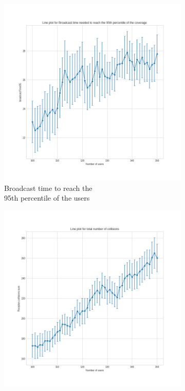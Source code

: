 \clearpage
{}
\begin{figure}[p]
	\centering
	\begin{subfigure}[b]{0.45\textwidth}
		\centering
		\includegraphics[width=\textwidth]{img/continuity-broadcasttime}
		\caption{Broadcast time to reach the\\95th percentile of the
		users}\label{subfig:continuity-bt95}
	\end{subfigure}
	\hfill
	\begin{subfigure}[b]{0.45\textwidth}
		\centering
		\includegraphics[width=\textwidth]{img/continuity-collisions}

\end{subfigure}
\end{figure}
